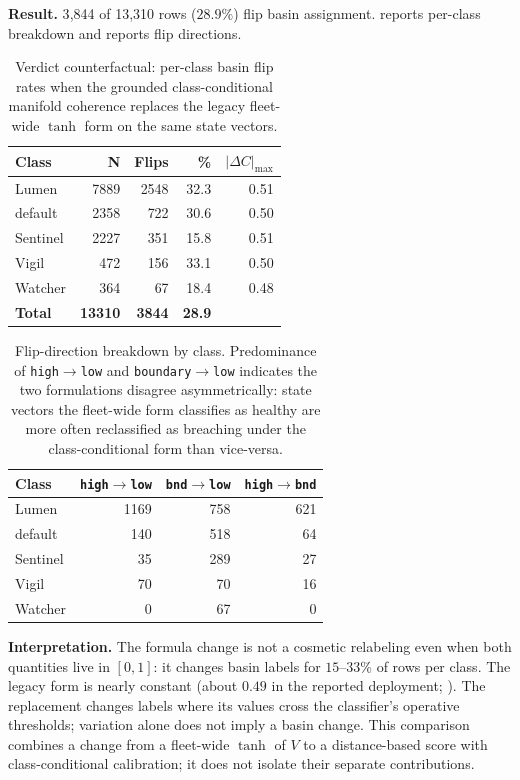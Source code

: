 \documentclass[11pt,twocolumn]{article}
\begin{document}
\textbf{Result.} 3{,}844 of 13{,}310 rows ($28.9\%$) flip basin
assignment.  reports per-class breakdown
and  reports flip directions.

\begin{table}[t]
\centering\small
\caption{Verdict counterfactual: per-class basin flip rates when the
grounded class-conditional manifold coherence replaces the legacy
fleet-wide $\tanh$ form on the same state vectors.}
\label{tab:counterfactual}
\begin{tabular}{@{}lrrrr@{}}
\toprule
\textbf{Class} & \textbf{N} & \textbf{Flips} & \textbf{\%} & $|\Delta C|_{\max}$ \\
\midrule
Lumen     & 7889 & 2548 & 32.3 & 0.51 \\
default   & 2358 &  722 & 30.6 & 0.50 \\
Sentinel  & 2227 &  351 & 15.8 & 0.51 \\
Vigil     &  472 &  156 & 33.1 & 0.50 \\
Watcher   &  364 &   67 & 18.4 & 0.48 \\
\midrule
\textbf{Total} & \textbf{13310} & \textbf{3844} & \textbf{28.9} & \\
\bottomrule
\end{tabular}
\end{table}

\begin{table}[t]
\centering\small
\caption{Flip-direction breakdown by class. Predominance of
\texttt{high$\to$low} and \texttt{boundary$\to$low} indicates the
two formulations disagree asymmetrically: state vectors the
fleet-wide form classifies as healthy are more often reclassified
as breaching under the class-conditional form than vice-versa.}
\label{tab:flip-directions}
\begin{tabular}{@{}lrrr@{}}
\toprule
\textbf{Class} & \texttt{high$\to$low} & \texttt{bnd$\to$low} & \texttt{high$\to$bnd} \\
\midrule
Lumen     & 1169 & 758 & 621 \\
default   &  140 & 518 &  64 \\
Sentinel  &   35 & 289 &  27 \\
Vigil     &   70 &  70 &  16 \\
Watcher   &    0 &  67 &   0 \\
\bottomrule
\end{tabular}
\end{table}

\textbf{Interpretation.} The formula change is not a cosmetic
relabeling even when both quantities live in $[0,1]$: it changes
basin labels for $15$--$33\%$ of rows per class. The legacy form
is nearly constant (about $0.49$ in the reported deployment;
). The replacement changes labels where its
values cross the classifier's operative thresholds; variation alone
does not imply a basin change. This comparison combines a change
from a fleet-wide $\tanh$ of $V$ to a distance-based score with
class-conditional calibration; it does not isolate their separate
contributions.
\end{document}
